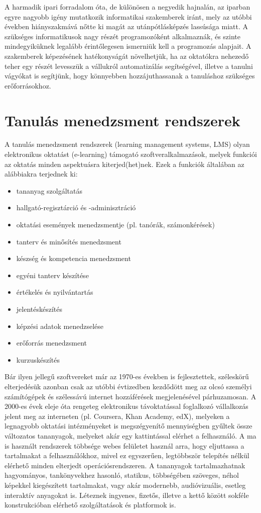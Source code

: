 A harmadik ipari forradalom óta, de különösen a negyedik hajnalán, az iparban egyre nagyobb igény mutatkozik informatikai szakemberek iránt, mely az utóbbi években hiányszakmává nőtte ki magát az utánpótlásképzés lassúsága miatt.
A szükséges informatikusok nagy részét programozóként alkalmaznák, és szinte mindegyiküknek legalább érintőlegesen ismerniük kell a programozás alapjait.
A szakemberek képezésének hatékonyságát növelhetjük, ha az oktatókra nehezedő teher egy részét levesszük a vállukról automatizálás segítségével, illetve a tanulni vágyókat is segítjünk, hogy könnyebben hozzájuthassanak a tanuláshoz szükséges erőforrásokhoz.

\section*{Tanulás menedzsment rendszerek}
A tanulás menedzsment rendszerek (learning management systems, LMS) olyan elektronikus oktatást (e-learning) támogató szoftveralkalmazások, melyek funkciói az oktatás minden aspektuásra kiterjed(het)nek.
Ezek a funkciók általában az alábbiakra terjednek ki:
\begin{itemize}
    \item tananyag szolgáltatás
    \item hallgató-regisztárció és -adminisztráció
    \item oktatási események menedzsmentje (pl. tanórák, számonkérések)
    \item tanterv és minősítés menedzsment
    \item készség és kompetencia menedzsment
    \item egyéni tanterv készítése
    \item értékelés és nyilvántartás
    \item jelentéskészítés
    \item képzési adatok menedzselése
    \item erőforrás menedzsment
    \item kurzuskészítés
\end{itemize}
Bár ilyen jellegű szoftvereket már az 1970-es években is fejlesztettek, széleskörű elterjedésük azonban csak az utóbbi évtizedben kezdődött meg az olcsó személyi számítógépek és szélessávú internet hozzáférések megjelenésével párhuzamosan.
A 2000-es évek eleje óta rengeteg elektronikus távoktatással foglalkozó vállalkozás jelent meg az interneten (pl. Coursera, Khan Academy, edX), melyeken a legnagyobb oktatási intézményeket is megszégyenítő mennyiségben gyűltek össze változatos tananyagok, melyeket akár egy kattintással elérhet a felhasználó.
A ma is használt rendszerek többsége webes felületet használ arra, hogy eljuttassa a tartalmakat a felhasználókhoz, mivel ez egyszerűen, legtöbbször telepítés nélkül elérhető minden elterjedt operációsrendszeren.
A tananyagok tartalmazhatnak hagyományos, tankönyvekhez hasonló, statikus, többségében szöveges, néhol képekkel kiegészített tartalmakat, vagy akár modernebb, audióvizuális, esetleg interaktív anyagokat is.
Léteznek ingyenes, fizetős, illetve a kettő között sokféle konstrukcióban elérhető szolgáltatások és platformok is.

